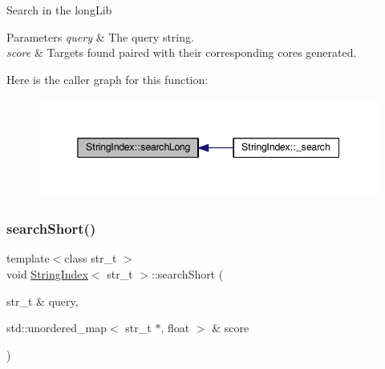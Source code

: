 Search in the long\+Lib 
\begin{DoxyParams}{Parameters}
{\em query} & The query string. \\
\hline
{\em score} & Targets found paired with their corresponding cores generated. \\
\hline
\end{DoxyParams}
Here is the caller graph for this function\+:\nopagebreak
\begin{figure}[H]
\begin{center}
\leavevmode
\includegraphics[width=345pt]{class_string_index_a80ddf83f3f207004142458317609c6d6_icgraph}
\end{center}
\end{figure}
\mbox{\label{class_string_index_a309f7697439fb3428de3c63dca6cdaa4}} 
\subsubsection{\texorpdfstring{search\+Short()}{searchShort()}}
{\footnotesize\ttfamily template$<$class str\+\_\+t $>$ \\
void \mbox{\hyperlink{class_string_index}{String\+Index}}$<$ str\+\_\+t $>$\+::search\+Short (\begin{DoxyParamCaption}\item[{str\+\_\+t \&}]{query,  }\item[{std\+::unordered\+\_\+map$<$ str\+\_\+t $\ast$, float $>$ \&}]{score }\end{DoxyParamCaption})}

